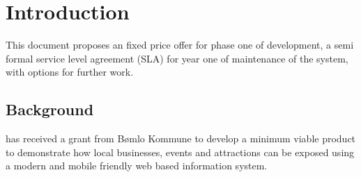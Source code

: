 \section{Introduction}
This document proposes an fixed price offer for phase one of development, a semi formal service level agreement (SLA) for year one of maintenance of the system, with options for further work. 


\subsection{Background}
\customername has received a grant from Bømlo Kommune to develop a minimum viable product to demonstrate how local businesses, events and attractions can be exposed using a modern and mobile friendly web based information system. 

